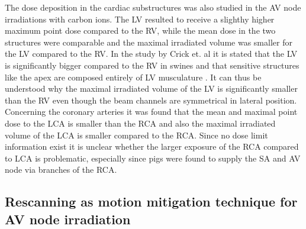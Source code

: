 \documentclass[type=dr, dr=rernat, accentcolor=tud7b,colorbacktitle, bigchapter, openright, twoside, 12pt ]{tudthesis}
\begin{document}
The dose deposition in the cardiac substructures was also studied in the AV node irradiations with carbon ions. The LV resulted 
to receive a slighthy higher maximum point dose compared to the RV, while the mean dose in the two structures were comparable and the 
maximal irradiated volume was smaller for the LV compared to the RV. In the study by Crick et. al it is stated that the LV is significantly 
bigger compared to the RV in swines and that sensitive structures like the apex are composed entirely of LV musculature \cite{Cri98}. It can 
thus be understood why the maximal irradiated volume of the LV is significantly smaller than the RV even though the beam channels are 
symmetrical in lateral position. Concerning the coronary arteries it was found that the mean and maximal point dose to the LCA is smaller than 
the RCA and also the maximal irradiated volume of the LCA is smaller compared to the RCA. Since no dose limit information exist it is unclear 
whether the larger exposure of the RCA compared to LCA is problematic, especially since pigs were found to supply the SA and AV node via branches of the RCA.


\vspace*{-0.3cm}
\subsection{Rescanning as motion mitigation technique for AV node irradiation}
\end{document}
